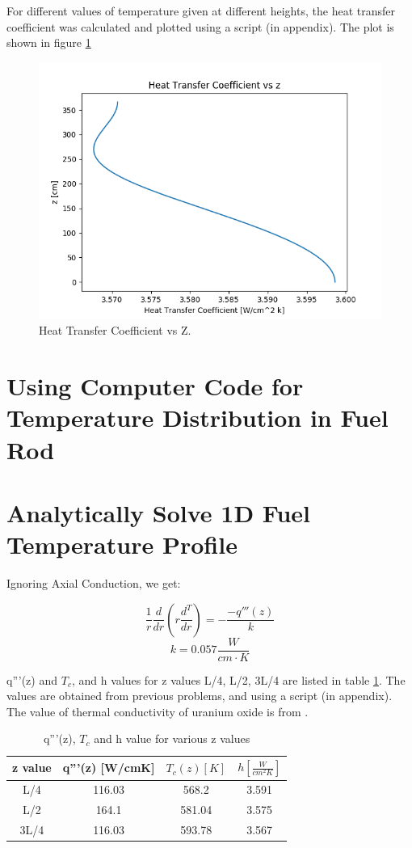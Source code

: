 \documentclass[12pt,letterpaper]{article}
\begin{document}
For different values of temperature given at different heights, the heat
transfer coefficient was calculated and plotted using a script (in appendix).
The plot is shown in figure \ref{fig:h_z}

\begin{figure}[htbp!]
    \begin{center}
        \includegraphics[scale=0.7]{h_z.png}
    \end{center}
    \caption{Heat Transfer Coefficient vs Z.}
    \label{fig:h_z}
\end{figure}

\section*{Using Computer Code for Temperature Distribution in Fuel Rod}


\section*{Analytically Solve 1D Fuel Temperature Profile}
Ignoring Axial Conduction, we get:

\[\frac{1}{r} \frac{d}{dr} (r \frac{d^T}{dr}) = -\frac{-q'''(z)}{k}\]
\[k = 0.057 \frac{W}{cm\cdot K}\]

q'''(z) and $T_c$, and h  values for z values L/4, L/2, 3L/4 are listed in table \ref{tab:q_vol}.
The values are obtained from previous problems, and using a script (in appendix).
The value of thermal conductivity of uranium oxide is from \cite{ronchi_thermal_1999}.

\begin{table}[h]
     \centering
    \begin{tabular}{cccc}
       \hline
       z value & q'''(z) [W/cmK] & $T_c(z) [K]$ & $h [\frac{W}{cm^2 K}] $ \\
       \hline
       L/4 & 116.03 & 568.2 & 3.591 \\
       L/2 & 164.1 & 581.04 & 3.575 \\
       3L/4 & 116.03 & 593.78 & 3.567 \\
       \hline
    \end{tabular}
    \caption {q'''(z), $T_c$ and h value for various z values}
    \label{tab:q_vol}
\end{table}
\end{document}
